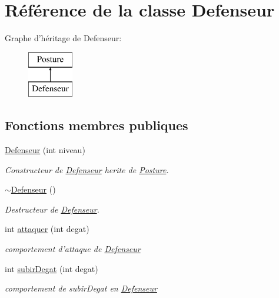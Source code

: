 \hypertarget{classDefenseur}{\section{Référence de la classe Defenseur}
\label{classDefenseur}
}
Graphe d'héritage de Defenseur\-:\begin{figure}[H]
\begin{center}
\leavevmode
\includegraphics[height=2.000000cm]{classDefenseur}
\end{center}
\end{figure}
\subsection*{Fonctions membres publiques}
\begin{DoxyCompactItemize}
\item 
\hyperlink{classDefenseur_ae49a06db373ffa7a67c77a605db384f4}{Defenseur} (int niveau)
\begin{DoxyCompactList}\small\item\em Constructeur de \hyperlink{classDefenseur}{Defenseur} herite de \hyperlink{classPosture}{Posture}. \end{DoxyCompactList}\item 
\hypertarget{classDefenseur_a85d338156a1df3f8f26b4b17d564d81e}{\hyperlink{classDefenseur_a85d338156a1df3f8f26b4b17d564d81e}{$\sim$\-Defenseur} ()}\label{classDefenseur_a85d338156a1df3f8f26b4b17d564d81e}

\begin{DoxyCompactList}\small\item\em Destructeur de \hyperlink{classDefenseur}{Defenseur}. \end{DoxyCompactList}\item 
int \hyperlink{classDefenseur_a9ec20f4bd6450776be10f4e9b037691d}{attaquer} (int degat)
\begin{DoxyCompactList}\small\item\em comportement d'attaque de \hyperlink{classDefenseur}{Defenseur} \end{DoxyCompactList}\item 
int \hyperlink{classDefenseur_aa8a5e55f036a24005d9fab761d2ca272}{subir\-Degat} (int degat)
\begin{DoxyCompactList}\small\item\em comportement de subir\-Degat en \hyperlink{classDefenseur}{Defenseur} \end{DoxyCompactList}\end{DoxyCompactItemize}
